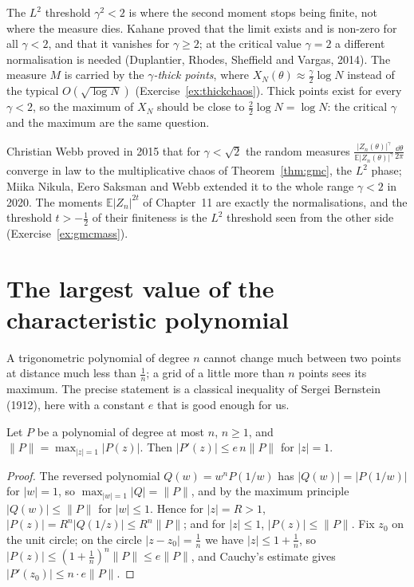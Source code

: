 The $L^2$ threshold $\gamma^2<2$ is where the second moment stops being finite, not where the measure dies. Kahane proved that the limit exists and is non-zero for all $\gamma<2$, and that it vanishes for $\gamma\ge2$; at the critical
value $\gamma=2$ a different normalisation is needed (Duplantier, Rhodes, Sheffield and Vargas, 2014). The measure $M$ is carried by the \emph{$\gamma$-thick points}, where $X_N(\theta)\approx\frac\gamma2\log N$ instead of the typical
$O(\sqrt{\log N})$ (Exercise~\ref{ex:thickchaos}). Thick points exist for every $\gamma<2$, so the maximum of $X_N$ should be close to $\frac22\log N=\log N$: the critical $\gamma$ and the maximum are the same question.

\begin{remark}
Christian Webb proved in 2015 that for $\gamma<\sqrt2$ the random measures $\frac{|Z_n(\theta)|^\gamma}{\mathbb E|Z_n(\theta)|^\gamma}\frac{\dd\theta}{2\pi}$ converge in law to the multiplicative chaos of Theorem~\ref{thm:gmc}, the $L^2$ phase; Miika Nikula, Eero Saksman
and Webb extended it to the whole range $\gamma<2$ in 2020. The moments $\mathbb E|Z_n|^{2t}$ of Chapter~11 are exactly the normalisations, and the threshold $t>-\frac12$ of their finiteness is the $L^2$ threshold seen
from the other side (Exercise~\ref{ex:gmcmass}).
\end{remark}

\section{The largest value of the characteristic polynomial}

A trigonometric polynomial of degree $n$ cannot change much between two points at distance much less than $\frac1n$; a grid of a little more than $n$ points sees its maximum. The precise statement is a classical inequality of
Sergei Bernstein (1912), here with a constant $e$ that is good enough for us.

\begin{lemma}\label{lem:bernstein}
Let $P$ be a polynomial of degree at most $n$, $n\ge1$, and $\|P\|=\max_{|z|=1}|P(z)|$. Then $|P'(z)|\le e\,n\|P\|$ for $|z|=1$.
\end{lemma}

\begin{proof}
The reversed polynomial $Q(w)=w^nP(1/w)$ has $|Q(w)|=|P(1/w)|$ for $|w|=1$, so $\max_{|w|=1}|Q|=\|P\|$, and by the maximum principle $|Q(w)|\le\|P\|$ for $|w|\le1$. Hence for $|z|=R>1$, $|P(z)|=R^n|Q(1/z)|\le R^n\|P\|$; and for $|z|\le1$,
$|P(z)|\le\|P\|$. Fix $z_0$ on the unit circle; on the circle $|z-z_0|=\frac1n$ we have $|z|\le1+\frac1n$, so $|P(z)|\le(1+\frac1n)^n\|P\|\le e\|P\|$, and Cauchy's estimate gives $|P'(z_0)|\le n\cdot e\|P\|$.
\end{proof}

